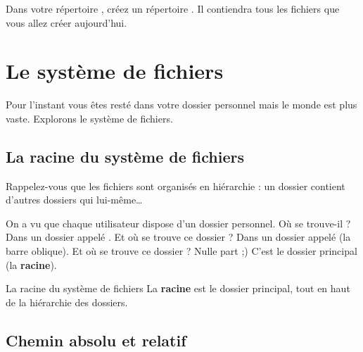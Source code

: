 \documentclass[a4paper,11pt]{style-esi/td}
\begin{document}
\entete
\titre
{}
\lastedit

\bigskip
\tableofcontents

\vfill
\begin{infobox}
    Dans votre répertoire , 
	créez un répertoire . 
    Il contiendra tous les fichiers que vous allez créer aujourd'hui. 
\end{infobox}
\vfill

\newpage

\section{Le système de fichiers}

	Pour l'instant vous êtes resté dans votre dossier personnel 
	mais le monde est plus vaste.
	Explorons le système de fichiers.

	\subsection{La racine du système de fichiers}

		Rappelez-vous que les fichiers sont organisés en hiérarchie :
		un dossier contient d'autres dossiers qui lui-même\dots

		On a vu que chaque utilisateur dispose d'un dossier personnel. 
		Où se trouve-il ? Dans un dossier appelé . 
		Et où se trouve ce dossier  ? 
		Dans un dossier appelé \og{}\samp{/}\fg{} (la barre oblique). 
		Et où se trouve ce dossier \og{}\samp{/}\fg{} ? Nulle part ;) 
		C'est le dossier principal (la \textbf{racine}).

		\begin{theorie}{La racine du système de fichiers}
			La \textbf{racine} est le dossier principal, 
			tout en haut de la hiérarchie des dossiers.
		\end{theorie}

	\subsection{Chemin absolu et relatif}

		
\end{document}
